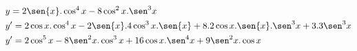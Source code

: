 \begin{ex}
\begin{align}
&y=2\sen{x}.\cos^4{x}-8\cos^2{x}.\sen^3{x}\nonumber\\
&y'=2\cos{x}.\cos^4{x}-2\sen{x}.4\cos^3{x}.\sen{x}+8.2\cos{x}.\sen{x}.\sen^3{x}+3.3\sen^3{x}\nonumber\\
&y'=2\cos^5{x}-8\sen^2{x}.\cos^3{x}+16\cos{x}.\sen^4{x}+9\sen^2{x}.\cos{x}\nonumber
\end{align}
\end{ex}